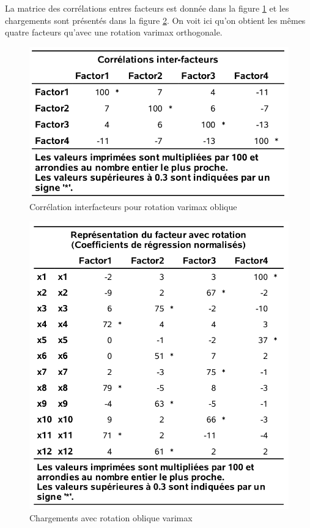 \documentclass[
  11pt,
  letterpaper,
]{book}
\theoremstyle{definition}
\theoremstyle{definition}
\theoremstyle{definition}
\theoremstyle{remark}
\begin{document}
La matrice des corrélations entres facteurs est donnée dans la figure \ref{fig:fig1p13} et les chargements sont présentés dans la figure \ref{fig:fig1p14}. On voit ici qu'on obtient les mêmes quatre facteurs qu'avec une rotation varimax orthogonale.

\begin{figure}

{\centering \includegraphics[width=0.7\linewidth]{figures/01-facto-e13} 

}

\caption{Corrélation interfacteurs pour rotation varimax oblique}\label{fig:fig1p13}
\end{figure}

\begin{figure}

{\centering \includegraphics[width=0.7\linewidth]{figures/01-facto-e14} 

}

\caption{Chargements avec rotation oblique varimax}\label{fig:fig1p14}
\end{figure}
\end{document}
